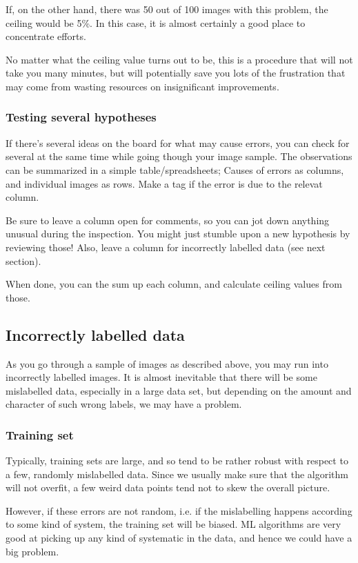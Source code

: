 \documentclass[12pt, a4paper]{article}
\numberwithin{equation}{section}
\begin{document}
If, on the other hand, there was 50 out of 100 images with this problem, the ceiling would be 5\%. In this case, it is almost certainly a good place to concentrate efforts.

No matter what the ceiling value turns out to be, this is a procedure that will not take you many minutes, but will potentially save you lots of the frustration that may come from wasting resources on insignificant improvements.

\subsubsection{Testing several hypotheses}
If there's several ideas on the board for what may cause errors, you can check for several at the same time while going though your image sample. The observations can be summarized in a simple table/spreadsheets; Causes of errors as columns, and individual images as rows. Make a tag if the error is due to the relevat column.

Be sure to leave a column open for comments, so you can jot down anything unusual during the inspection. You might just stumble upon a new hypothesis by reviewing those! Also, leave a column for incorrectly labelled data (see next section).

When done, you can the sum up each column, and calculate ceiling values from those.

\subsection{Incorrectly labelled data}
As you go through a sample of images as described above, you may run into incorrectly labelled images. It is almost inevitable that there will be some mislabelled data, especially in a large data set, but depending on the amount and character of such wrong labels, we may have a problem.

\subsubsection{Training set}
Typically, training sets are large, and so tend to be rather robust with respect to a few, randomly mislabelled data. Since we usually make sure that the algorithm will not overfit, a few weird data points tend not to skew the overall picture.

However, if these errors are not random, i.e. if the mislabelling happens according to some kind of system, the training set will be biased. ML algorithms are very good at picking up any kind of systematic in the data, and hence we could have a big problem.
\end{document}
